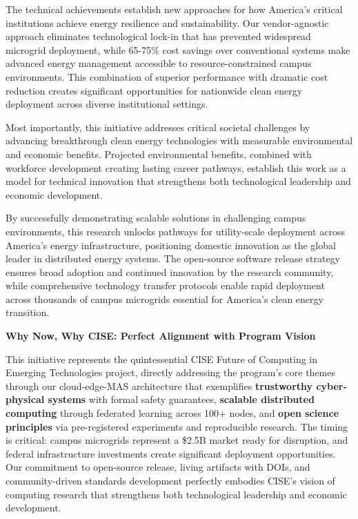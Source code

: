 \documentclass[12pt]{article}
\begin{document}
The technical achievements establish new approaches for how America's critical institutions achieve energy resilience and sustainability. Our vendor-agnostic approach eliminates technological lock-in that has prevented widespread microgrid deployment, while 65-75\% cost savings over conventional systems make advanced energy management accessible to resource-constrained campus environments. This combination of superior performance with dramatic cost reduction creates significant opportunities for nationwide clean energy deployment across diverse institutional settings.

Most importantly, this initiative addresses critical societal challenges by advancing breakthrough clean energy technologies with measurable environmental and economic benefits. Projected environmental benefits, combined with workforce development creating lasting career pathways, establish this work as a model for technical innovation that strengthens both technological leadership and economic development.

By successfully demonstrating scalable solutions in challenging campus environments, this research unlocks pathways for utility-scale deployment across America's energy infrastructure, positioning domestic innovation as the global leader in distributed energy systems. The open-source software release strategy ensures broad adoption and continued innovation by the research community, while comprehensive technology transfer protocols enable rapid deployment across thousands of campus microgrids essential for America's clean energy transition.

\textbf{Why Now, Why CISE: Perfect Alignment with Program Vision}

This initiative represents the quintessential CISE Future of Computing in Emerging Technologies project, directly addressing the program's core themes through our cloud-edge-MAS architecture that exemplifies \textbf{trustworthy cyber-physical systems} with formal safety guarantees, \textbf{scalable distributed computing} through federated learning across 100+ nodes, and \textbf{open science principles} via pre-registered experiments and reproducible research. The timing is critical: campus microgrids represent a \$2.5B market ready for disruption, and federal infrastructure investments create significant deployment opportunities. Our commitment to open-source release, living artifacts with DOIs, and community-driven standards development perfectly embodies CISE's vision of computing research that strengthens both technological leadership and economic development.
\end{document}
